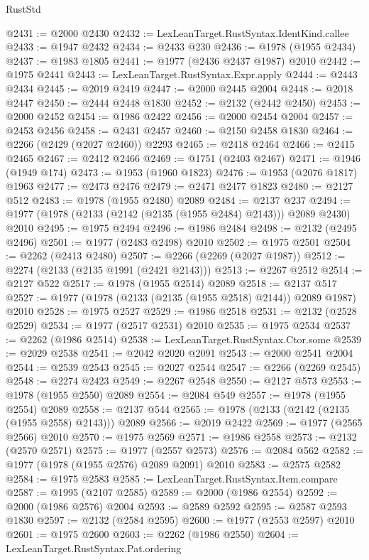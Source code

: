 \begin{lexlean}{RustStd}
\begin{coremodule}
@2431 := @2000 @2430
@2432 := LexLeanTarget.RustSyntax.IdentKind.callee
@2433 := @1947 @2432
@2434 := @2433 @230
@2436 := @1978 (@1955 @2434)
@2437 := @1983 @1805
@2441 := @1977 (@2436 @2437 @1987) @2010
@2442 := @1975 @2441
@2443 := LexLeanTarget.RustSyntax.Expr.apply
@2444 := @2443 @2434
@2445 := @2019 @2419
@2447 := @2000 @2445 @2004
@2448 := @2018 @2447
@2450 := @2444 @2448 @1830
@2452 := @2132 (@2442 @2450)
@2453 := @2000 @2452
@2454 := @1986 @2422
@2456 := @2000 @2454 @2004
@2457 := @2453 @2456
@2458 := @2431 @2457
@2460 := @2150 @2458 @1830
@2464 := @2266 (@2429 (@2027 @2460)) @2293
@2465 := @2418 @2464
@2466 := @2415 @2465
@2467 := @2412 @2466
@2469 := @1751 (@2403 @2467)
@2471 := @1946 (@1949 @174)
@2473 := @1953 (@1960 @1823)
@2476 := @1953 (@2076 @1817) @1963
@2477 := @2473 @2476
@2479 := @2471 @2477 @1823
@2480 := @2127 @512
@2483 := @1978 (@1955 @2480) @2089
@2484 := @2137 @237
@2494 := @1977 (@1978 (@2133 (@2142 (@2135 (@1955 @2484) @2143))) @2089 @2430) @2010
@2495 := @1975 @2494
@2496 := @1986 @2484
@2498 := @2132 (@2495 @2496)
@2501 := @1977 (@2483 @2498) @2010
@2502 := @1975 @2501
@2504 := @2262 (@2413 @2480)
@2507 := @2266 (@2269 (@2027 @1987))
@2512 := @2274 (@2133 (@2135 @1991 (@2421 @2143)))
@2513 := @2267 @2512
@2514 := @2127 @522
@2517 := @1978 (@1955 @2514) @2089
@2518 := @2137 @517
@2527 := @1977 (@1978 (@2133 (@2135 (@1955 @2518) @2144)) @2089 @1987) @2010
@2528 := @1975 @2527
@2529 := @1986 @2518
@2531 := @2132 (@2528 @2529)
@2534 := @1977 (@2517 @2531) @2010
@2535 := @1975 @2534
@2537 := @2262 (@1986 @2514)
@2538 := LexLeanTarget.RustSyntax.Ctor.some
@2539 := @2029 @2538
@2541 := @2042 @2020 @2091
@2543 := @2000 @2541 @2004
@2544 := @2539 @2543
@2545 := @2027 @2544
@2547 := @2266 (@2269 @2545)
@2548 := @2274 @2423
@2549 := @2267 @2548
@2550 := @2127 @573
@2553 := @1978 (@1955 @2550) @2089
@2554 := @2084 @549
@2557 := @1978 (@1955 @2554) @2089
@2558 := @2137 @544
@2565 := @1978 (@2133 (@2142 (@2135 (@1955 @2558) @2143))) @2089
@2566 := @2019 @2422
@2569 := @1977 (@2565 @2566) @2010
@2570 := @1975 @2569
@2571 := @1986 @2558
@2573 := @2132 (@2570 @2571)
@2575 := @1977 (@2557 @2573)
@2576 := @2084 @562
@2582 := @1977 (@1978 (@1955 @2576) @2089 @2091) @2010
@2583 := @2575 @2582
@2584 := @1975 @2583
@2585 := LexLeanTarget.RustSyntax.Item.compare
@2587 := @1995 (@2107 @2585)
@2589 := @2000 (@1986 @2554)
@2592 := @2000 (@1986 @2576) @2004
@2593 := @2589 @2592
@2595 := @2587 @2593 @1830
@2597 := @2132 (@2584 @2595)
@2600 := @1977 (@2553 @2597) @2010
@2601 := @1975 @2600
@2603 := @2262 (@1986 @2550)
@2604 := LexLeanTarget.RustSyntax.Pat.ordering

\end{coremodule}
\end{lexlean}
